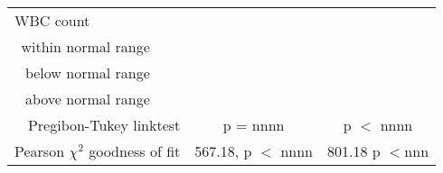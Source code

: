\begin{table}
\begin{adjustwidth}{-1.5cm}{}
\begin{tabular}{rcccccc}
 \multicolumn{1}{l}{WBC count}	& & & & & &  \\									
	within normal range 							&	&	 &   &			 &			&				 \\  [3.5pt]
	below normal range  							&	&	 &   &			 &			&				 \\
	above normal range  							&	&	 &   &			 &			&				 \\  [3.5pt]
\midrule
\multicolumn{3}{r}{Pregibon-Tukey linktest}   & \multicolumn{2}{c}{p = nnnn}	 	&	 \multicolumn{2}{c}{p $<$ nnnn}  \\
\multicolumn{3}{r}{Pearson $\chi^2$ goodness of fit} & \multicolumn{2}{c}{567.18, p $<$ nnnn} &	\multicolumn{2}{c}{801.18	p $<$nnn} \\  [3.5pt]
 \bottomrule 
\end{tabular}
\end{adjustwidth}
\end{table}